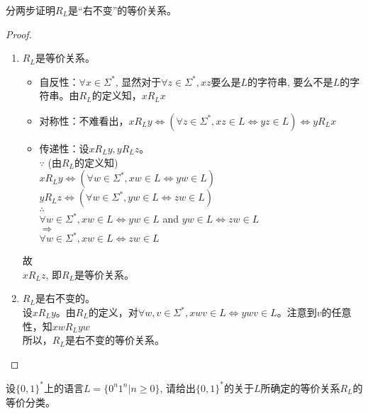 \begin{solution} 分两步证明$R_L$是“右不变”的等价关系。
	\begin{proof}
		\hfill
		\begin{enumerate}
			\item $R_L$是等价关系。
			\begin{itemize}
				\item 自反性：$\forall x\in\Sigma^\ast$, 显然对于$\forall z\in\Sigma^\ast,xz$要么是$L$的字符串, 要么不是$L$的字符串。由$R_L$的定义知，$xR_Lx$
			    \item 对称性：不难看出，$xR_Ly\Leftrightarrow(\forall z\in\Sigma^\ast,xz\in L\Leftrightarrow yz\in L)\Leftrightarrow yR_Lx$
			    \item 传递性：设$xR_Ly,yR_Lz$。\\
			    $\because$ (由$R_L$的定义知)\\
			    $xR_Ly\Leftrightarrow(\forall w\in\Sigma^\ast, xw\in L\Leftrightarrow yw\in L)$\\
			    $yR_Lz\Leftrightarrow(\forall w\in\Sigma^\ast, yw\in L\Leftrightarrow zw\in L)$\\
			    $\therefore$\\
			    $\forall w\in\Sigma^\ast, xw\in L\Leftrightarrow yw\in L$ and $yw\in L\Leftrightarrow zw\in L$\\
			    $\Rightarrow$\\
			    $\forall w\in\Sigma^\ast, xw\in L\Leftrightarrow zw\in L$
		    \end{itemize}
	    	故\\
	    	$xR_Lz$, 即$R_L$是等价关系。
	    	\item $R_L$是右不变的。\\
	    	设$xR_Ly$。由$R_L$的定义，对$\forall w,v\in\Sigma^\ast,xwv\in L\Leftrightarrow ywv\in L$。注意到$v$的任意性，知$xwR_Lyw$\\
	    	所以，$R_L$是右不变的等价关系。
		\end{enumerate}
	\end{proof}
\end{solution}

\begin{exercise}
	设$\{0,1\}^\ast$上的语言$L=\{0^n1^n|n\ge 0\}$, 请给出$\{0,1\}^\ast$的关于$L$所确定的等价关系$R_L$的等价分类。
\end{exercise}


